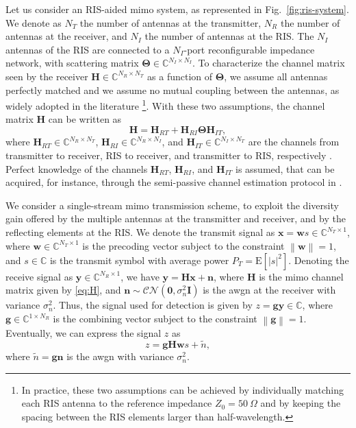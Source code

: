 \documentclass[twocolumn,10pt]{IEEEtran}
\begin{document}
Let us consider an RIS-aided \gls{mimo} system, as represented in Fig.~\ref{fig:ris-system}.
We denote as $N_{T}$ the number of antennas at the transmitter, $N_{R}$ the number of antennas at the receiver, and $N_{I}$ the number of antennas at the RIS.
The $N_{I}$ antennas of the RIS are connected to a $N_{I}$-port reconfigurable impedance network, with scattering matrix $\boldsymbol{\Theta}\in\mathbb{C}^{N_{I}\times N_{I}}$.
To characterize the channel matrix seen by the receiver $\mathbf{H}\in\mathbb{C}^{N_{R}\times N_{T}}$ as a function of $\boldsymbol{\Theta}$, we assume all antennas perfectly matched and we assume no mutual coupling between the antennas, as widely adopted in the literature \cite{she20}\footnote{In practice, these two assumptions can be achieved by individually matching each RIS antenna to the reference impedance $Z_{0}=50\:\Omega$ and by keeping the spacing between the RIS elements larger than half-wavelength.}.
With these two assumptions, the channel matrix $\mathbf{H}$ can be written as
\begin{equation}
\mathbf{H}=\mathbf{H}_{RT}+\mathbf{H}_{RI}\boldsymbol{\Theta}\mathbf{H}_{IT},\label{eq:H}
\end{equation}
where $\mathbf{H}_{RT}\in\mathbb{C}^{N_{R}\times N_{T}}$, $\mathbf{H}_{RI}\in\mathbb{C}^{N_{R}\times N_{I}}$, and $\mathbf{H}_{IT}\in\mathbb{C}^{N_{I}\times N_{T}}$ are the channels from transmitter to receiver, RIS to receiver, and transmitter to RIS, respectively \cite{she20}.
Perfect knowledge of the channels $\mathbf{H}_{RT}$, $\mathbf{H}_{RI}$, and $\mathbf{H}_{IT}$ is assumed, that can be acquired, for instance, through the semi-passive channel estimation protocol in \cite{wu21}.

We consider a single-stream \gls{mimo} transmission scheme, to exploit the diversity gain offered by the multiple antennas at the transmitter and receiver, and by the reflecting elements at the RIS.
We denote the transmit signal as $\mathbf{x}=\mathbf{w}s\in\mathbb{C}^{N_{T}\times1}$, where $\mathbf{w}\in\mathbb{C}^{N_{T}\times1}$ is the precoding vector subject to the constraint $\left\|\mathbf{w}\right\|=1$, and $s\in\mathbb{C}$ is the transmit symbol with average power $P_{T}=\mathrm{E}[\left|s\right|^{2}]$.
Denoting the receive signal as $\mathbf{y}\in\mathbb{C}^{N_{R}\times1}$, we have $\mathbf{y}=\mathbf{H}\mathbf{x}+\mathbf{n}$, where $\mathbf{H}$ is the \gls{mimo} channel matrix given by \eqref{eq:H}, and $\mathbf{n}\sim\mathcal{CN}\left(\mathbf{0},\sigma_{n}^{2}\mathbf{I}\right)$ is the \gls{awgn} at the receiver with variance $\sigma_{n}^{2}$.
Thus, the signal used for detection is given by $z=\mathbf{g}\mathbf{y}\in\mathbb{C}$, where $\mathbf{g}\in\mathbb{C}^{1\times N_{R}}$ is the combining vector subject to the constraint $\left\|\mathbf{g}\right\|=1$.
Eventually, we can express the signal $z$ as
\begin{equation}
z=\mathbf{g}\mathbf{H}\mathbf{w}s+\tilde{n},\label{eq:z}
\end{equation}
where $\tilde{n}=\mathbf{g}\mathbf{n}$ is the \gls{awgn} with variance $\sigma_{n}^{2}$.
\end{document}
